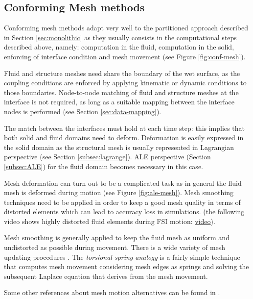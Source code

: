 \subsection{Conforming Mesh methods}
\label{sec:conforming-mesh}

Conforming mesh methods adapt very well to the partitioned approach described in Section \ref{sec:monolithic} as they usually consists in the computational steps described above, namely: computation in the fluid, computation in the solid, enforcing of interface condition and mesh movement (see Figure \ref{fig:conf-mesh}).   

Fluid and structure meshes need share the boundary of the wet surface, as the coupling conditions are enforced by applying kinematic or dynamic conditions to those boundaries.
Node-to-node matching of fluid and structure meshes at the interface is not required, as long as a suitable mapping between the interface nodes is performed (see Section \ref{sec:data-mapping}).

The match between the interfaces must hold at each time step: this implies that both solid and fluid domains need to deform. Deformation is easily expressed in the solid domain as the structural mesh is usually represented in Lagrangian perspective (see Section \ref{subsec:lagrange}). ALE perspective (Section \ref{subsec:ALE}) for the fluid domain becomes necessary in this case.

Mesh deformation can turn out to be a complicated task as in general the fluid mesh is deformed during motion (see Figure \ref{fig:ale-mesh}). Mesh smoothing techniques need to be applied in order to keep a good mesh quality in terms of distorted elements which can lead to accuracy loss in simulations. (the following video shows highly distorted fluid elements during FSI motion: \href{https://youtu.be/zJ7PR90Y2TI}{video}). 

Mesh smoothing is generally applied to keep the fluid mesh as uniform and undistorted as possible during movement.
There is a wide variety of mesh updating procedures \cite{van2007comparison}.
The \textit{torsional spring analogy} \cite{degand2002three} is a fairly simple technique that computes mesh movement considering mesh edges as springs and solving the subsequent Laplace equation that derives from the mesh movement. 

Some other references about mesh motion alternatives can be found in \cite{gonzalez2009mesh}.



